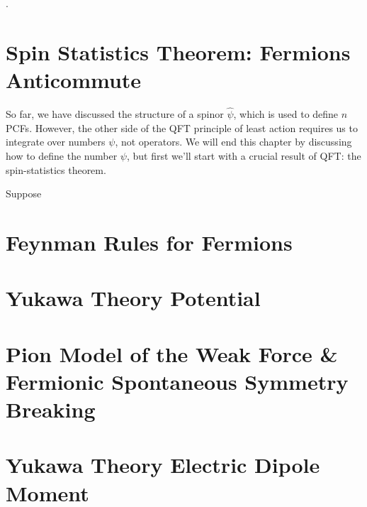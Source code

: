 .



\section{Spin Statistics Theorem: Fermions Anticommute}
So far, we have discussed the structure of a spinor $\hat \psi$, which is used to define $n$PCFs. However, the other side of the QFT principle of least action requires us to integrate over numbers $\psi$, not operators. We will end this chapter by discussing how to define the number $\psi$, but first we'll start with a crucial result of QFT: the spin-statistics theorem.

Suppose 



\section{Feynman Rules for Fermions}

\section{Yukawa Theory Potential}

\section{Pion Model of the Weak Force \& Fermionic Spontaneous Symmetry Breaking}

\section{Yukawa Theory Electric Dipole Moment}